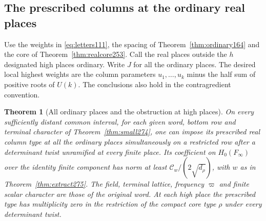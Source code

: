 \documentclass[a4paper,11pt]{article}
\newtheorem{theorem}[proposition]{Theorem}
\theoremstyle{definition}
\theoremstyle{remark}
\numberwithin{equation}{section}
\begin{document}
\subsection{The prescribed columns at the ordinary real places}\label{nav:VIII-46}
Use the weights in \eqref{eq:letters111}, the spacing of
Theorem~\ref{thm:ordinary164} and the core of
Theorem~\ref{thm:realcore253}. Call the real places outside
the \(h\) designated high places ordinary. Write \(J\) for
all the ordinary places. The desired local highest weights
are the column parameters \(u_1,\ldots,u_k\) minus the half
sum of positive roots of \(U(k)\). The conclusions also
hold in the contragredient convention.

\begin{theorem}[All ordinary places and the obstruction at high places]\leavevmode
\label{thm:word275}
On every sufficiently distant common interval, for each given word,
bottom row and terminal character of Theorem~\ref{thm:small274},
one can impose its prescribed real column type at all the
ordinary places simultaneously on a restricted row after a
determinant twist unramified at every finite place. Its coefficient
on \(H_0(F_\infty)\) over the identity finite component has norm
at least \(\mathcal C_w/(2\sqrt{d_\rho})\), with \(w\) as in
Theorem~\ref{thm:extract275}. The field, terminal lattice,
frequency \(\varpi\) and finite scalar character are those of
the original word. At
each high place the prescribed type has multiplicity zero in
the restriction of the compact core type \(\rho\) under
every determinant twist.
\end{theorem}
\end{document}
